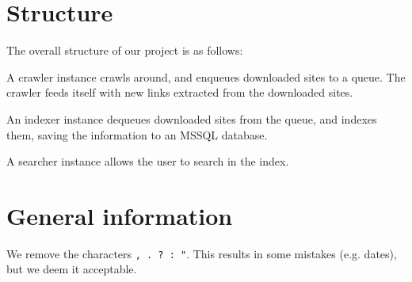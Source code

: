 \section{Structure}
The overall structure of our project is as follows:

A crawler instance crawls around, and enqueues downloaded sites to a queue. The crawler feeds itself with new links extracted from the downloaded sites.

An indexer instance dequeues downloaded sites from the queue, and indexes them, saving the information to an MSSQL database.

A searcher instance allows the user to search in the index.

\section{General information}\label{sec:rem-chars}
We remove the characters \texttt{, . ? : "}. This results in some mistakes (e.g. dates), but we deem it acceptable.